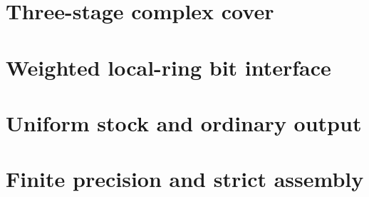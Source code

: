 \documentclass[11pt]{article}
\begin{document}
\section{Three-stage complex cover}

\section{Weighted local-ring bit interface}

\section{Uniform stock and ordinary output}

\section{Finite precision and strict assembly}

\end{document}
